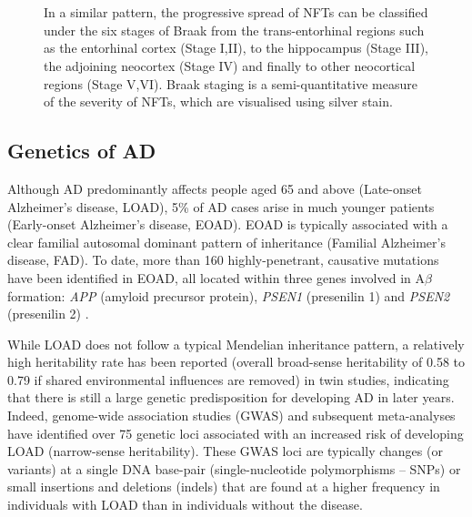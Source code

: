 \begin{figure}[!htp]
{	\\
	\\
	In a similar pattern, the progressive spread of NFTs can be classified under the six stages of Braak from the trans-entorhinal regions such as the entorhinal cortex (Stage I,II), to the hippocampus (Stage III), the adjoining neocortex (Stage IV) and finally to other neocortical regions (Stage V,VI)\cite{H1991}. Braak staging is a semi-quantitative measure of the severity of NFTs, which are visualised using silver stain. 
	}
	\label{fig:AD_development}
\end{figure}

\newpage
\subsection{Genetics of AD}
\label{Genetics_of_AD}
Although AD predominantly affects people aged 65 and above (Late-onset Alzheimer’s disease, LOAD), 5\% of AD cases arise in much younger patients (Early-onset Alzheimer’s disease, EOAD). EOAD is typically associated with a clear familial autosomal dominant pattern of inheritance (Familial Alzheimer’s disease, FAD)\cite{Jarmolowicz2015}. To date, more than 160 highly-penetrant, causative mutations have been identified in EOAD, all located within three genes involved in A$\beta$ formation: \textit{APP} (amyloid precursor protein), \textit{PSEN1} (presenilin 1) and \textit{PSEN2} (presenilin 2) \cite{LM2010,Chai2007}. %

While LOAD does not follow a typical Mendelian inheritance pattern, a relatively high heritability rate has been reported (overall broad-sense heritability of 0.58 to 0.79 if shared environmental influences are removed\cite{Gatz2006}) in twin studies, indicating that there is still a large genetic predisposition for developing AD in later years. Indeed, genome-wide association studies (GWAS) and subsequent meta-analyses \cite{Bellenguez2020,Naj2020,Kunkle2019,Jansen2019,Lambert2013,Naj2011,Hollingworth2011,Harold2009,Lambert2009,Bertram2008} have identified over 75 genetic loci associated with an increased risk of developing LOAD (narrow-sense heritability). These GWAS loci are typically changes (or variants) at a single DNA base-pair (single-nucleotide polymorphisms – SNPs) or small insertions and deletions (indels) that are found at a higher frequency in individuals with LOAD than in individuals without the disease. 

